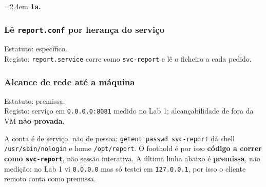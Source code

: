 \documentclass[a4paper,11pt]{article}
\newenvironment{answer}[1]{%
  \par\addvspace{7pt}\noindent
  \hangindent=2.4em\hangafter=1
  {\color{sscnblue}\bfseries #1\hspace{0.55em}}\ignorespaces}
  {\par\addvspace{5pt}}
\newcommand{\cmd}[1]{\textcolor{sscnblue}{\texttt{#1}}}
\begin{document}
\begin{answer}{1a.}
\subsubsection*{L\^{e} \cmd{report.conf} por heran\c{c}a do servi\c{c}o}
Estatuto: espec\'{i}fico.\\
Registo: \cmd{report.service} corre como \cmd{svc-report} e l\^{e} o ficheiro a cada pedido.

\subsubsection*{Alcance de rede at\'{e} a m\'{a}quina}
Estatuto: premissa.\\
Registo: servi\c{c}o em \cmd{0.0.0.0:8081} medido no Lab 1; alcan\c{c}abilidade de fora da VM \textbf{n\~{a}o provada}.

A conta \'e de servi\c{c}o, n\~ao de pessoa: \cmd{getent passwd
svc-report} d\'a shell \cmd{/usr/sbin/nologin} e home \cmd{/opt/report}. O foothold
\'e por isso \textbf{c\'odigo a correr como \cmd{svc-report}}, n\~ao sess\~ao interativa.
A \'ultima linha abaixo \'e \textbf{premissa}, n\~ao medi\c{c}\~ao: no Lab 1 vi
\cmd{0.0.0.0} mas s\'o testei em \cmd{127.0.0.1}, por isso o cliente remoto conta
como premissa.
\end{answer}
\end{document}
